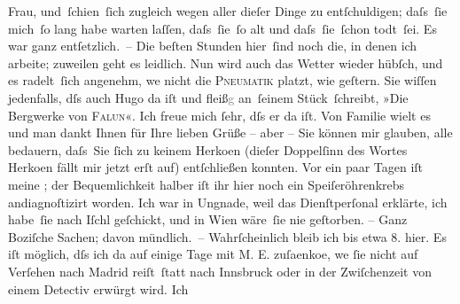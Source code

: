                Frau, und ſchien ſich zugleich wegen aller dieſer Dinge zu entſchuldigen; daſs ſie
               mich ſo lang habe warten laſſen, daſs ſie ſo alt und daſs ſie ſchon todt ſei. Es war
               ganz ent{\pb}ſetzlich. – Die beſten
               Stunden hier ſind noch die, in denen ich arbeite; zuweilen geht es leidlich. Nun wird
               auch das Wetter wieder hübſch, und es radelt ſich angenehm, we{\geminationn} nicht die \textsc{Pneumatik} platzt,
               wie geſtern. Sie wiſſen jedenfalls, dſs auch Hugo da iſt und fleiß\textcolor{gray}{g} an ſeinem Stück ſchreibt, »Die Bergwerke von \textsc{Falun}«. Ich freue mich{ }ſehr, dſs er da iſt. Von Familie wi{\geminationm}elt es und man dankt Ihnen für Ihre lieben Grüße – aber
               – Sie können mir glauben, alle bedauern, daſs Sie {\pb}ſich zu keinem Herko{\geminationm}en (dieſer Doppelſinn des Wortes Herko{\geminationm}en fällt mir jetzt erſt auf) entſchließen konnten. Vor
               ein paar Tagen iſt meine \label{K_L04131-1v}\label{K_L04131-1}; der Bequemlichkeit halber iſt ihr hier noch ein Speiſeröhrenkrebs
               andiagnoſtizirt worden. Ich war in Ungnade, weil das Dienſtperſonal erklärte, ich
               habe ſie nach Iſchl geſchickt, und in Wien wäre ſie nie geſtorben. – Ganz Boziſche Sachen; davon mündlich. – {\pb}Wahrſcheinlich bleib ich bis etwa
                  8. hier. Es iſt möglich, dſs ich da{\geminationn} auf
               einige Tage mit M. E. zuſa{\geminationm}enko{\geminationm}e, we{\geminationn}{ }ſie nicht auf Verſehen nach Madrid reiſt ſtatt nach Innsbruck oder in der Zwiſchenzeit von einem Detectiv erwürgt wird. Ich
